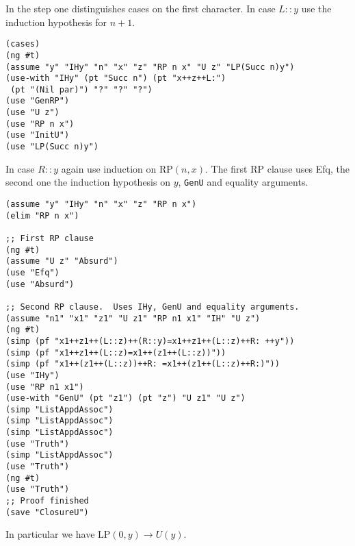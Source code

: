 \documentclass[12pt]{amsart}
\begin{document}
In the step one distinguishes cases on the first character.  In case
$L::y$ use the induction hypothesis for $n+1$.
\begin{verbatim}
(cases)
(ng #t)
(assume "y" "IHy" "n" "x" "z" "RP n x" "U z" "LP(Succ n)y")
(use-with "IHy" (pt "Succ n") (pt "x++z++L:")
 (pt "(Nil par)") "?" "?" "?")
(use "GenRP")
(use "U z")
(use "RP n x")
(use "InitU")
(use "LP(Succ n)y")
\end{verbatim}
In case $R::y$ again use induction on $\mathrm{RP}(n,x)$.  The first
$\mathrm{RP}$ clause uses Efq, the second one the induction hypothesis
on $y$, \verb|GenU| and equality arguments.
\begin{verbatim}
(assume "y" "IHy" "n" "x" "z" "RP n x")
(elim "RP n x")

;; First RP clause
(ng #t)
(assume "U z" "Absurd")
(use "Efq")
(use "Absurd")

;; Second RP clause.  Uses IHy, GenU and equality arguments.
(assume "n1" "x1" "z1" "U z1" "RP n1 x1" "IH" "U z")
(ng #t)
(simp (pf "x1++z1++(L::z)++(R::y)=x1++z1++(L::z)++R: ++y"))
(simp (pf "x1++z1++(L::z)=x1++(z1++(L::z))"))
(simp (pf "x1++(z1++(L::z))++R: =x1++(z1++(L::z)++R:)"))
(use "IHy")
(use "RP n1 x1")
(use-with "GenU" (pt "z1") (pt "z") "U z1" "U z")
(simp "ListAppdAssoc")
(simp "ListAppdAssoc")
(simp "ListAppdAssoc")
(use "Truth")
(simp "ListAppdAssoc")
(use "Truth")
(ng #t)
(use "Truth")
;; Proof finished
(save "ClosureU")
\end{verbatim}
In particular we have $\mathrm{LP}(0,y) \to U(y)$.
\end{document}
